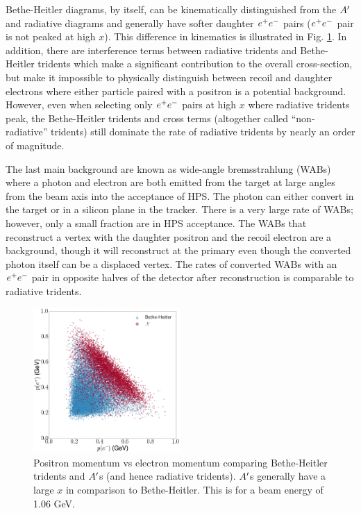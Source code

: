  Bethe-Heitler diagrams, by itself, can be kinematically distinguished from the $A^\prime$ and radiative diagrams and generally have softer daughter $e^{+}e^{-}$ pairs ($e^{+}e^{-}$ pair is not peaked at high $x$). This difference in kinematics is illustrated in Fig. \ref{fig:pvsp}. In addition, there are interference terms between radiative tridents and Bethe-Heitler tridents which make a significant contribution to the overall cross-section, but make it impossible to physically distinguish between recoil and daughter electrons where either particle paired with a positron is a potential background. However, even when selecting only $e^{+}e^{-}$ pairs at high $x$ where radiative tridents peak, the Bethe-Heitler tridents and cross terms (altogether called ``non-radiative'' tridents) still dominate the rate of radiative tridents by nearly an order of magnitude.
 
 The last main background are known as wide-angle bremsstrahlung (WABs) where a photon and electron are both emitted from the target at large angles from the beam axis into the acceptance of HPS. The photon can either convert in the target or in a silicon plane in the tracker. There is a very large rate of WABs; however, only a small fraction are in HPS acceptance. The WABs that reconstruct a vertex with the daughter positron and the recoil electron are a background, though it will reconstruct at the primary even though the converted photon itself can be a displaced vertex. The rates of converted WABs with an $e^{+}e^{-}$ pair in opposite halves of the detector after reconstruction is comparable to radiative tridents.
 
 \begin{figure}
    \centering
    \includegraphics[width=0.5\textwidth]{figs/selection/p_vs_p.png}
    \caption{Positron momentum vs electron momentum comparing Bethe-Heitler tridents and $A^\prime$s (and hence radiative tridents). $A^\prime$s generally have a large $x$ in comparison to Bethe-Heitler. This is for a beam energy of 1.06 GeV.}
    \label{fig:pvsp}
\end{figure}

